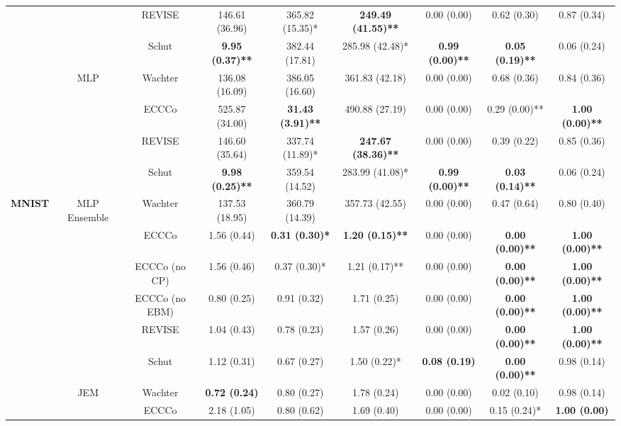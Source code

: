 \begin{table}
{\begin{tabular}[t]{>{}c|c|c|c|c|c|c|c|c}
 &  & REVISE & 146.61 (36.96) & 365.82 (15.35)* & \textbf{249.49 (41.55)**} & 0.00 (0.00) & 0.62 (0.30) & 0.87 (0.34)\\

 &  & Schut & \textbf{9.95 (0.37)**} & 382.44 (17.81) & 285.98 (42.48)* & \textbf{0.99 (0.00)**} & \textbf{0.05 (0.19)**} & 0.06 (0.24)\\

 & \multirow{-4}{*}{\centering\arraybackslash MLP} & Wachter & 136.08 (16.09) & 386.05 (16.60) & 361.83 (42.18) & 0.00 (0.00) & 0.68 (0.36) & 0.84 (0.36)\\
\cline{2-9}
 &  & ECCCo & 525.87 (34.00) & \textbf{31.43 (3.91)**} & 490.88 (27.19) & 0.00 (0.00) & 0.29 (0.00)** & \textbf{1.00 (0.00)**}\\

 &  & REVISE & 146.60 (35.64) & 337.74 (11.89)* & \textbf{247.67 (38.36)**} & 0.00 (0.00) & 0.39 (0.22) & 0.85 (0.36)\\

 &  & Schut & \textbf{9.98 (0.25)**} & 359.54 (14.52) & 283.99 (41.08)* & \textbf{0.99 (0.00)**} & \textbf{0.03 (0.14)**} & 0.06 (0.24)\\

\multirow{-16}{*}{\centering\arraybackslash \textbf{MNIST}} & \multirow{-4}{*}{\centering\arraybackslash MLP Ensemble} & Wachter & 137.53 (18.95) & 360.79 (14.39) & 357.73 (42.55) & 0.00 (0.00) & 0.47 (0.64) & 0.80 (0.40)\\
\cline{1-9}
 &  & ECCCo & 1.56 (0.44) & \textbf{0.31 (0.30)*} & \textbf{1.20 (0.15)**} & 0.00 (0.00) & \textbf{0.00 (0.00)**} & \textbf{1.00 (0.00)**}\\

 &  & ECCCo (no CP) & 1.56 (0.46) & 0.37 (0.30)* & 1.21 (0.17)** & 0.00 (0.00) & \textbf{0.00 (0.00)**} & \textbf{1.00 (0.00)**}\\

 &  & ECCCo (no EBM) & 0.80 (0.25) & 0.91 (0.32) & 1.71 (0.25) & 0.00 (0.00) & \textbf{0.00 (0.00)**} & \textbf{1.00 (0.00)**}\\

 &  & REVISE & 1.04 (0.43) & 0.78 (0.23) & 1.57 (0.26) & 0.00 (0.00) & \textbf{0.00 (0.00)**} & \textbf{1.00 (0.00)**}\\

 &  & Schut & 1.12 (0.31) & 0.67 (0.27) & 1.50 (0.22)* & \textbf{0.08 (0.19)} & \textbf{0.00 (0.00)**} & 0.98 (0.14)\\

 & \multirow{-6}{*}{\centering\arraybackslash JEM} & Wachter & \textbf{0.72 (0.24)} & 0.80 (0.27) & 1.78 (0.24) & 0.00 (0.00) & 0.02 (0.10) & 0.98 (0.14)\\
\cline{2-9}
 &  & ECCCo & 2.18 (1.05) & 0.80 (0.62) & 1.69 (0.40) & 0.00 (0.00) & 0.15 (0.24)* & \textbf{1.00 (0.00)}\\


\end{tabular}}
\end{table}
